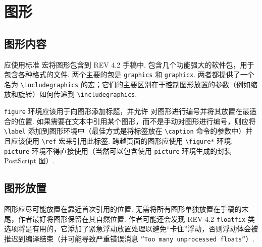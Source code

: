 \documentclass[twocolumn, amssymb, bibnotes, aps, prd, 10pt]{revtex4-2}
\newcommand{\revtex}{REV\hologo{TeX}}
\newcommand{\classoption}[1]{\texttt{#1}}
\newcommand{\macro}[1]{\texttt{\textbackslash#1}}
\newcommand{\m}[1]{\macro{#1}}
\newcommand{\env}[1]{\texttt{#1}}
\begin{document}
\section{图形}
\subsection{图形内容}

应使用标准 {} 宏将图形包含到 {\revtex} 4.2 手稿中. {} 包含几个功能强大的软件包，用于包含各种格式的文件. 两个主要的包是 \texttt{graphics} 和 \texttt{graphicx}. 两者都提供了一个名为 \m{includegraphics} 的宏；它们的主要区别在于控制图形放置的参数（例如缩放和旋转）如何传递到 \m{includegraphics}.

\env{figure} 环境应该用于向图形添加标题，并允许 {} 对图形进行编号并将其放置在最适合的位置. 如果需要在文本中引用某个图形，而不是手动对图形进行编号，则应将 \m{label} 添加到图形环境中（最佳方式是将标签放在 \m{caption} 命令的参数中）并且应该使用 \m{ref} 宏来引用此标签. 跨越页面的图形应使用 \m{figure*} 环境. \env{picture} 环境不得直接使用（当然可以包含使用 \env{picture} 环境生成的封装 PostScript 图）.

\subsection{\label{sec:figplace}图形放置}
图形应尽可能放置在靠近首次引用的位置. 无需将所有图形单独放置在手稿的末尾，作者最好将图形保留在其自然位置. 作者可能还会发现 {\revtex} 4.2 \classoption{floatfix} 类选项将是有用的，它添加了紧急浮动放置处理以避免``卡住''浮动，否则浮动体会被推迟到编译结束（并可能导致严重错误消息 \texttt{''Too many unprocessed floats''}）.
\end{document}
